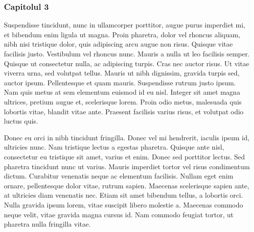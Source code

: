 \begin{frame}
\frametitle{Capitolul 3} 
Suspendisse tincidunt, nunc in ullamcorper porttitor, augue purus imperdiet mi, et bibendum enim ligula ut magna. Proin pharetra, dolor vel rhoncus aliquam, nibh nisi tristique dolor, quis adipiscing arcu augue non risus. Quisque vitae facilisis justo. Vestibulum vel rhoncus nunc. Mauris a nulla ut leo facilisis semper. Quisque ut consectetur nulla, ac adipiscing turpis. Cras nec auctor risus. Ut vitae viverra urna, sed volutpat tellus. Mauris ut nibh dignissim, gravida turpis sed, auctor ipsum. Pellentesque et quam mauris. Suspendisse rutrum justo ipsum. Nam quis metus at sem elementum euismod id eu nisl. Integer sit amet magna ultrices, pretium augue et, scelerisque lorem. Proin odio metus, malesuada quis lobortis vitae, blandit vitae ante. Praesent facilisis varius risus, et volutpat odio luctus quis.

Donec eu orci in nibh tincidunt fringilla. Donec vel mi hendrerit, iaculis ipsum id, ultricies nunc. Nam tristique lectus a egestas pharetra. Quisque ante nisl, consectetur eu tristique sit amet, varius et enim. Donec sed porttitor lectus. Sed pharetra tincidunt nunc ut varius. Mauris imperdiet tortor vel risus condimentum dictum. Curabitur venenatis neque ac elementum facilisis. Nullam eget enim ornare, pellentesque dolor vitae, rutrum sapien. Maecenas scelerisque sapien ante, at ultricies diam venenatis nec. Etiam sit amet bibendum tellus, a lobortis orci. Nulla gravida ipsum lorem, vitae suscipit libero molestie a. Maecenas commodo neque velit, vitae gravida magna cursus id. Nam commodo feugiat tortor, ut pharetra nulla fringilla vitae.
\end{frame} 
